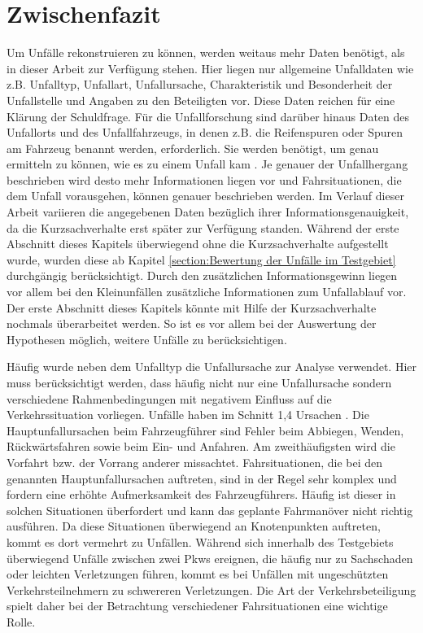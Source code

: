 \section{Zwischenfazit}
Um Unfälle rekonstruieren zu können, werden weitaus mehr Daten benötigt, als in dieser Arbeit zur Verfügung stehen. Hier liegen nur allgemeine Unfalldaten wie z.B. Unfalltyp, Unfallart, Unfallursache, Charakteristik und Besonderheit der Unfallstelle und Angaben zu den Beteiligten vor. Diese Daten reichen für eine Klärung der Schuldfrage. Für die Unfallforschung sind darüber hinaus Daten des Unfallorts und des Unfallfahrzeugs, in denen z.B. die Reifenspuren oder Spuren am Fahrzeug benannt werden, erforderlich. Sie werden benötigt, um genau ermitteln zu können, wie es zu einem Unfall kam \parencite[S. 28]{Burg.2017}. Je genauer der Unfallhergang beschrieben wird desto mehr Informationen liegen vor und Fahrsituationen, die dem Unfall vorausgehen, können genauer beschrieben werden. Im Verlauf dieser Arbeit variieren die angegebenen Daten bezüglich ihrer Informationsgenauigkeit, da die Kurzsachverhalte erst später zur Verfügung standen. Während der erste Abschnitt dieses Kapitels überwiegend ohne die Kurzsachverhalte aufgestellt wurde, wurden diese ab Kapitel \ref{section:Bewertung der Unfälle im Testgebiet} durchgängig berücksichtigt. Durch den zusätzlichen Informationsgewinn liegen vor allem bei den Kleinunfällen zusätzliche Informationen zum Unfallablauf vor. Der erste Abschnitt dieses Kapitels könnte mit Hilfe der Kurzsachverhalte nochmals überarbeitet werden. So ist es vor allem bei der Auswertung der Hypothesen möglich, weitere Unfälle zu berücksichtigen.

Häufig wurde neben dem Unfalltyp die Unfallursache zur Analyse verwendet. Hier muss berücksichtigt werden, dass häufig nicht nur eine Unfallursache sondern verschiedene Rahmenbedingungen mit negativem Einfluss auf die Verkehrssituation vorliegen. Unfälle haben im Schnitt 1,4 Ursachen \parencite[S. 149]{StatistischesBundesamt.2016} . Die Hauptunfallursachen beim Fahrzeugführer sind Fehler beim Abbiegen, Wenden, Rückwärtsfahren sowie beim Ein- und Anfahren. Am zweithäufigsten wird die Vorfahrt bzw. der Vorrang anderer missachtet. Fahrsituationen, die bei den genannten Hauptunfallursachen auftreten, sind in der Regel sehr komplex und fordern eine erhöhte Aufmerksamkeit des Fahrzeugführers. Häufig ist dieser in solchen Situationen überfordert und kann das geplante Fahrmanöver nicht richtig ausführen. Da diese Situationen überwiegend an Knotenpunkten auftreten, kommt es dort vermehrt zu Unfällen. Während sich innerhalb des Testgebiets überwiegend Unfälle zwischen zwei Pkws ereignen, die häufig nur zu Sachschaden oder leichten Verletzungen führen, kommt es bei Unfällen mit ungeschützten Verkehrsteilnehmern zu schwereren Verletzungen. Die Art der Verkehrsbeteiligung spielt daher bei der Betrachtung verschiedener Fahrsituationen eine wichtige Rolle.

